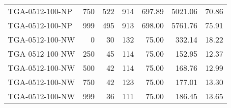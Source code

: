 \begin{table}[htbp]
{\begin{tabular}{lrrrrrr}
    TGA-0512-100-NP & 750    & 522    & 914    & 697.89 & 5021.06 & 70.86 \\
    TGA-0512-100-NP & 999    & 495    & 913    & 698.00 & 5761.76 & 75.91 \\ \hline
    TGA-0512-100-NW & 0      & 30     & 132    & 75.00  & 332.14 & 18.22 \\
    TGA-0512-100-NW & 250    & 45     & 114    & 75.00  & 152.95 & 12.37 \\
    TGA-0512-100-NW & 500    & 42     & 114    & 75.00  & 168.76 & 12.99 \\
    TGA-0512-100-NW & 750    & 42     & 123    & 75.00  & 177.01 & 13.30 \\
    TGA-0512-100-NW & 999    & 36     & 111    & 75.00  & 186.45 & 13.65 \\
    \bottomrule
    \end{tabular}}
  \label{tab:addlabel}%
\end{table}%
